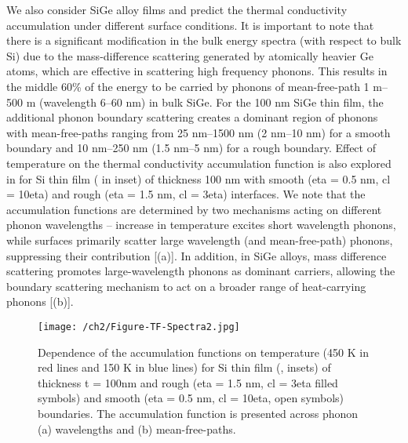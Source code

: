 \par We also consider SiGe alloy films and predict the thermal conductivity accumulation under different surface conditions. It is important to note that there is a significant modification in the bulk  energy spectra (with respect to bulk Si) due to the mass-difference scattering generated by atomically heavier Ge atoms, which are effective in scattering high frequency phonons. This results in the middle 60\% of the energy to be carried by phonons of mean-free-path 1 \si{\micro}m–500 \si{\micro}m (wavelength 6–60 nm) in bulk SiGe. For the 100 nm SiGe thin film, the additional phonon boundary scattering creates a dominant region of phonons with mean-free-paths ranging from 25 nm–1500 nm (2 nm–10 nm) for a smooth boundary and 10 nm–250 nm (1.5 nm–5 nm) for a rough boundary. Effect of temperature on the thermal conductivity accumulation function is also explored in  for Si thin film ( in inset) of thickness 100 nm with smooth (\gls{eta} = 0.5 nm, \gls{cl} = 10\gls{eta}) and rough (\gls{eta} = 1.5 nm, \gls{cl} = 3\gls{eta}) interfaces. We note that the accumulation functions are determined by two mechanisms acting on different phonon wavelengths -- increase in temperature excites short wavelength phonons, while surfaces primarily scatter large wavelength (and mean-free-path) phonons, suppressing their contribution [(a)]. In addition, in SiGe alloys, mass difference scattering promotes large-wavelength phonons as dominant carriers, allowing the boundary scattering mechanism to act on a broader range of heat-carrying phonons [(b)]. 
\begin{figure}[hbt]
  \centering \texttt{[image: /ch2/Figure-TF-Spectra2.jpg]}
  \caption{Dependence of the accumulation functions on temperature (450 K in red lines and 150 K in blue lines) for Si thin film (, insets) of thickness \gls{t} = 100nm and rough (\gls{eta} = 1.5 nm, \gls{cl} = 3\gls{eta} filled symbols) and smooth (\gls{eta} = 0.5 nm, \gls{cl} = 10\gls{eta}, open symbols) boundaries. The accumulation function is presented across phonon (a) wavelengths and (b) mean-free-paths.}
  \label{fig:ch2-tf-spectra-2}
\end{figure}
